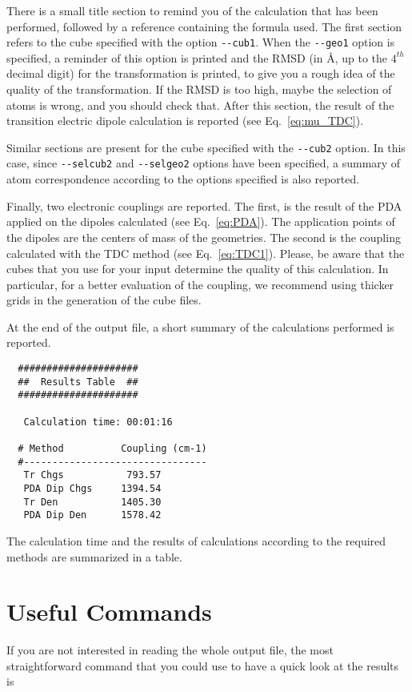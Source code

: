 \documentclass[a4paper]{article}
\begin{document}
There is a small title section to remind you of the calculation that has been performed, followed by a reference containing the formula used. The first section refers to the cube specified with the option \verb|--cub1|. When the \verb|--geo1| option is specified, a reminder of this option is printed and the RMSD (in \AA{}, up to the $4^{th}$ decimal digit) for the transformation is printed, to give you a rough idea of the quality of the transformation. If the RMSD is too high, maybe the selection of atoms is wrong, and you should check that.
After this section, the result of the transition electric dipole calculation is reported (see Eq.~\ref{eq:mu_TDC}).

Similar sections are present for the cube specified with the \verb|--cub2| option. In this case, since \verb|--selcub2| and \verb|--selgeo2| options have been specified, a summary of atom correspondence according to the options specified is also reported.

Finally, two electronic couplings are reported. The first, is the result of the PDA applied on the dipoles calculated (see Eq.~\ref{eq:PDA}). The application points of the dipoles are the centers of mass of the geometries. The second is the coupling calculated with the TDC method (see Eq.~\ref{eq:TDC1}).
Please, be aware that the cubes that you use for your input determine the quality of this calculation. In particular, for a better evaluation of the coupling, we recommend using thicker grids in the generation of the cube files.

At the end of the output file, a short summary of the calculations performed is reported.

\begin{verbatim}
  #####################
  ##  Results Table  ##
  #####################
  
   Calculation time: 00:01:16
  
  # Method          Coupling (cm-1)
  #--------------------------------
   Tr Chgs           793.57 
   PDA Dip Chgs     1394.54 
   Tr Den           1405.30 
   PDA Dip Den      1578.42 
\end{verbatim}

The calculation time and the results of calculations according to the required methods are summarized in a table.

\section*{Useful Commands}
If you are not interested in reading the whole output file, the most straightforward command that you could use to have a quick look at the results is
\end{document}
